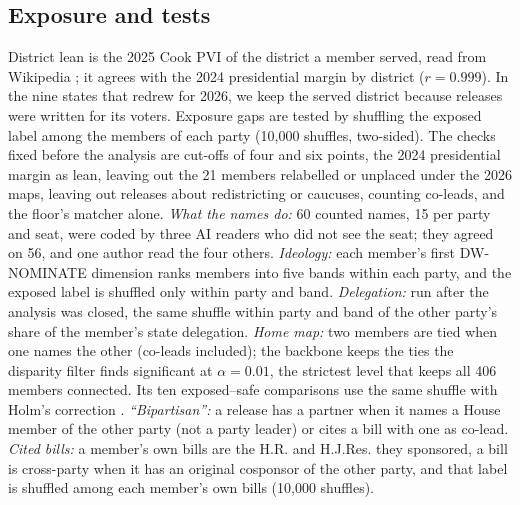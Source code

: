 \documentclass[9pt,twocolumn,twoside]{pnas-new}
\begin{document}
{\subsection*{Exposure and tests}
District lean is the 2025 Cook PVI \cite{cook2025pvi} of the district a member served, read from Wikipedia
\cite{wikipedia2025pvi}; it agrees with the 2024 presidential margin by district \cite{downballot2024} ($r = 0.999$).
In the nine states that redrew for 2026, we keep the served district because releases were written for its voters.
Exposure gaps are tested by shuffling the exposed label among the members of each party (10,000 shuffles,
two-sided). The checks fixed before the analysis are cut-offs of four and six points, the 2024 presidential margin as
lean, leaving out the 21 members relabelled or unplaced under the 2026 maps, leaving out releases about redistricting
or caucuses, counting co-leads, and the floor's matcher alone. \emph{What the names do:} 60 counted names, 15 per party
and seat, were coded by three AI readers who did not see the seat; they agreed on 56, and one author read the
four others. \emph{Ideology:} each member's first DW-NOMINATE dimension \cite{voteview2026} ranks members into five
bands within each party, and the exposed label is shuffled only within party and band. \emph{Delegation:} run after
the analysis was closed, the same shuffle within party and band of the other party's share of the member's state
delegation. \emph{Home map:} two members are tied when one names the other (co-leads included); the backbone keeps the
ties the disparity filter \cite{serrano2009} finds significant at $\alpha = 0.01$, the strictest level that keeps all
406 members connected. Its ten exposed--safe comparisons use the same shuffle with Holm's correction
\cite{holm1979}. \emph{``Bipartisan'':} a release has a partner when it names a House member of the other party (not a
party leader) or cites a bill with one as co-lead. \emph{Cited bills:} a member's own bills are the H.R. and H.J.Res.
they sponsored, a bill is cross-party when it has an original cosponsor of the other party, and that label is shuffled
among each member's own bills (10,000 shuffles).

}
\end{document}
